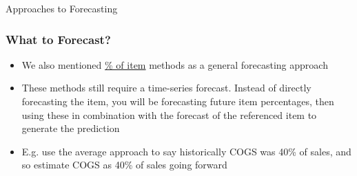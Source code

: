 \documentclass[handout, 11pt]{beamer}
\begin{document}
\begin{section}{Approaches to Forecasting}
\begin{frame}
\begin{itemize}
\end{itemize}
\end{frame}
\begin{frame}
\frametitle{What to Forecast?}
\begin{itemize}
\item We also mentioned
\underline{\% of item}
methods as a general forecasting approach
\vfill
\item These methods still require a time-series forecast. Instead of directly forecasting the item, you will be forecasting future item percentages, then using these in combination with the forecast of the referenced item to generate the prediction
\vfill
\item E.g. use the average approach to say historically COGS was 40\% of sales, and so estimate COGS as 40\% of sales going forward
\end{itemize}
\end{frame}
\end{section}
\end{document}
